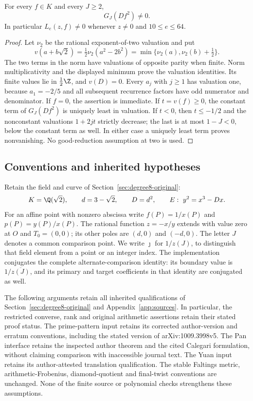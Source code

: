 \begin{lemma}
\label{lem:quartic-reciprocal-nonzero}
For every $f\in K$ and every $J\ge2$,
\[
                 G_J(Df^2)\ne0.
\]
In particular $L_e(z,f)\ne0$ whenever $z\ne0$ and $10\le e\le64$.
\end{lemma}
\begin{proof}
Let $\nu_2$ be the rational exponent-of-two valuation and put
\[
 v(a+b\sqrt2)=\tfrac12\nu_2(a^2-2b^2)
             =\min\{\nu_2(a),\nu_2(b)+\tfrac12\}.
\]
The two terms in the norm have valuations of opposite parity when finite.
Norm multiplicativity and the displayed minimum prove the valuation
identities. Its finite values lie in $\tfrac12\Z$, and $v(D)=0$.
Every $a_j$ with $j\ge1$ has valuation one, because $a_1=-2/5$ and
all subsequent recurrence factors have odd numerator and denominator.
If $f=0$, the assertion is immediate. If $t=v(f)\ge0$, the constant
term of $G_J(Df^2)$ is uniquely least in valuation. If $t<0$, then
$t\le-1/2$ and the nonconstant valuations $1+2jt$ strictly decrease;
the last is at most $1-J<0$, below the constant term as well. In either
case a uniquely least term proves nonvanishing. No good-reduction
assumption at two is used.
\end{proof}

\subsection{Conventions and inherited hypotheses}
\label{sec:v4-inherited}

Retain the field and curve of Section~\ref{sec:degree8-original}:
\[
 K=\Q(\sqrt2),\qquad d=3-\sqrt2,\qquad D=d^2,
 \qquad E:\ y^2=x^3-Dx.
\]
For an affine point with nonzero abscissa write $f(P)=1/x(P)$ and
$p(P)=y(P)/x(P)$. The rational function $z=-x/y$ extends with value zero
at $O$ and $T_0=(0,0)$; its other poles are $(d,0)$ and $(-d,0)$.
The letter $J$ denotes a common comparison point. We write $\jmath$ for
$1/z(J)$, to distinguish that field element from a point or an integer index.
The implementation conjugates the complete alternate-comparison identity:
its boundary value is $1/\overline{z(J)}$, and its primary and target
coefficients in that identity are conjugated as well.

The following arguments retain all inherited qualifications of
Section~\ref{sec:degree8-original} and Appendix~\ref{app:sources}. In particular, the restricted converse, rank and original
arithmetic assertions retain their stated proof status. The prime-pattern
input retains its corrected author-version and erratum conventions,
including the stated version of arXiv:1009.3998v5. The Pan interface retains
the inspected author theorem and the cited Calegari formulation, without
claiming comparison with inaccessible journal text. The Yuan input retains
its author-attested translation qualification. The stable Faltings metric,
arithmetic-Frobenius, diamond-quotient and final-twist conventions are
unchanged. None of the finite source or polynomial checks strengthens these
assumptions.

